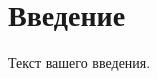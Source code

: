 \documentclass[a4paper,14pt]{extarticle}
\begin{document}
	
	\section{Введение}
	Текст вашего введения.
	
\end{document}
